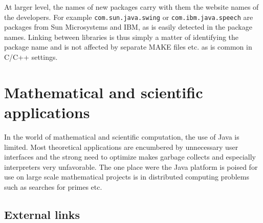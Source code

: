 \documentclass[12pt]{article}
\begin{document}
At larger level, the names of new packages carry with them the website names of the developers.  For example \texttt{com.sun.java.swing} or \texttt{com.ibm.java.speech} are packages from Sun Microsystems and IBM, as is easily detected in the package names.  Linking between libraries is thus simply a matter of identifying the package name and is not affected by separate MAKE files etc. as is common in C/C++ settings.

\section{Mathematical and scientific applications}

In the world of mathematical and scientific computation, the use of Java is limited.  Most theoretical applications are encumbered by unnecessary user interfaces and the strong need to optimize makes garbage collects and especially interpreters very unfavorable.  The one place were the Java platform is poised for use on large scale mathematical projects is in distributed computing problems such as searches for primes etc.   

\subsection{External links}

\end{document}
